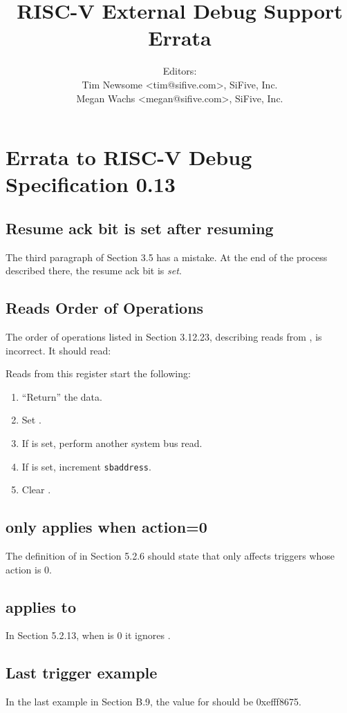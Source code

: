 \documentclass[twoside,11pt]{article}
\newenvironment{steps}[1]
  {
     \vspace{1ex}
     \noindent #1
     \begin{enumerate}[nolistsep]
  }
  {
     \end{enumerate}
     \vspace{1ex}
 }
\begin{document}
\title{RISC-V External Debug Support Errata\\
\GITHash
}
\author{Editors: \\
Tim Newsome \textless tim@sifive.com\textgreater, SiFive, Inc. \\
Megan Wachs \textless megan@sifive.com\textgreater, SiFive, Inc.}
\date{\GITAuthorDate}
\maketitle

\section{Errata to RISC-V Debug Specification 0.13}

\subsection{Resume ack bit is set after resuming}

The third paragraph of Section 3.5 has a mistake. At the end of the process
described there, the resume ack bit is \emph{set}.

\subsection{\Rsbdatazero Reads Order of Operations}

The order of operations listed in Section 3.12.23, describing reads from
\Rsbdatazero, is incorrect. It should read:

\begin{steps}{Reads from this register start the following:}
    \item ``Return'' the data.
    \item Set \Fsbbusy.
    \item If \Fsbreadondata is set, perform another system bus read.
    \item If \Fsbautoincrement is set, increment {\tt sbaddress}.
    \item Clear \Fsbbusy.
\end{steps}

\subsection{\Fmte only applies when action=0}

The definition of \Fmte in Section 5.2.6 should state that \Fmte only affects
triggers whose action is 0.

\subsection{\Fsselect applies to \Fsvalue}

In Section 5.2.13, when \Fsselect is 0 it ignores \Fsvalue.

\subsection{Last trigger example}

In the last example in Section B.9, the value for  should be
0xefff8675.
\end{document}
